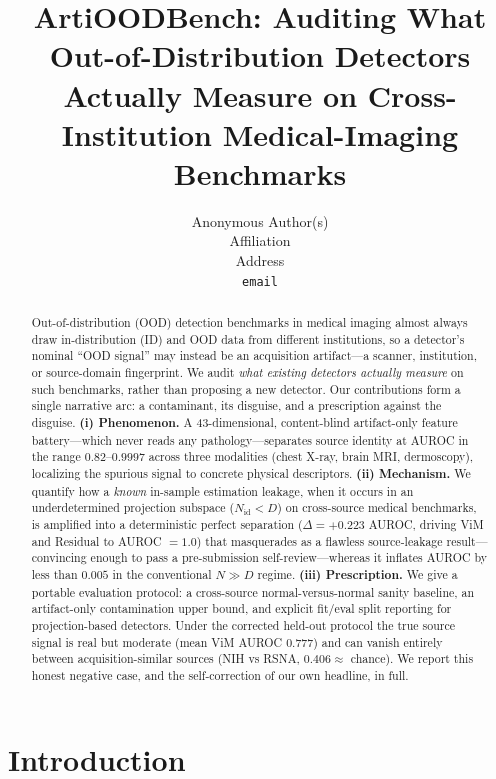 \documentclass{article}
\title{ArtiOODBench: Auditing What Out-of-Distribution Detectors Actually
Measure on Cross-Institution Medical-Imaging Benchmarks}
\author{%
  Anonymous Author(s)\\
  Affiliation\\
  Address\\
  \texttt{email}
}
\begin{document}
\maketitle

\begin{abstract}
Out-of-distribution (OOD) detection benchmarks in medical imaging almost
always draw in-distribution (ID) and OOD data from different institutions, so
a detector's nominal ``OOD signal'' may instead be an acquisition artifact---a
scanner, institution, or source-domain fingerprint. We audit \emph{what
existing detectors actually measure} on such benchmarks, rather than proposing
a new detector. Our contributions form a single narrative arc: a contaminant,
its disguise, and a prescription against the disguise. \textbf{(i) Phenomenon.}
A 43-dimensional, content-blind artifact-only feature battery---which never
reads any pathology---separates source identity at AUROC in the range
$0.82$--$0.9997$ across three modalities (chest X-ray, brain MRI, dermoscopy),
localizing the spurious signal to concrete physical descriptors. \textbf{(ii)
Mechanism.} We quantify how a \emph{known} in-sample estimation leakage, when
it occurs in an underdetermined projection subspace ($N_\text{id} < D$) on
cross-source medical benchmarks, is amplified into a deterministic perfect
separation ($\Delta = +0.223$ AUROC, driving ViM and Residual to AUROC $=1.0$)
that masquerades as a flawless source-leakage result---convincing enough to
pass a pre-submission self-review---whereas it inflates AUROC by less than
$0.005$ in the conventional $N \gg D$ regime. \textbf{(iii) Prescription.} We
give a portable evaluation protocol: a cross-source normal-versus-normal sanity
baseline, an artifact-only contamination upper bound, and explicit fit/eval
split reporting for projection-based detectors. Under the corrected held-out
protocol the true source signal is real but moderate (mean ViM AUROC
$0.777$) and can vanish entirely between acquisition-similar sources (NIH vs
RSNA, $0.406 \approx$ chance). We report this honest negative case, and the
self-correction of our own headline, in full.
\end{abstract}

\section{Introduction}
\end{document}
